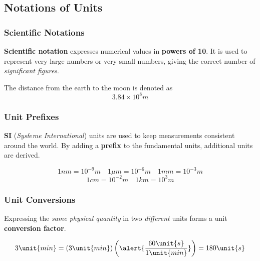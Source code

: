 
\subsection{Notations of Units}
\begin{frame}
\frametitle{Scientific Notations}
\begin{definition}
{\alert{\textbf{Scientific notation}}} expresses numerical values in \textbf{powers of 10}. It is used to represent very large numbers or very small numbers, giving the correct number of \emph{significant figures}.
\end{definition}
\begin{example}
The distance from the earth to the moon is denoted as
\[
3.84\times 10^{8}\unit{m}
\]
\end{example}
\end{frame}
\begin{frame}
\frametitle{Unit Prefixes}
\begin{definition}
\textbf{SI} (\emph{Syst$\grave{e}$me International}) units are used to keep measurements consistent around the world. By adding a {\alert{\textbf{prefix}}} to the fundamental units, additional units are derived.
\end{definition}
\begin{example}
\[1\unit{nm}=10^{-9}\unit{m}\quad 1\unit{\mu m}=10^{-6}\unit{m}\quad 1\unit{mm}=10^{-3}\unit{m}\]
\[1\unit{cm}=10^{-2}\unit{m}\quad 1\unit{km}=10^{3}\unit{m}\]
\end{example}
\end{frame}
\begin{frame}
\frametitle{Unit Conversions}
\begin{definition}
Expressing the \emph{same physical quantity} in two \emph{different} units forms a unit \textbf{\alert{conversion factor}}.
\end{definition}
\begin{example}
\[3\unit{min}=(3\unit{min})\left({\alert{\frac{60\unit{s}}{1\unit{min}}}}\right)=180\unit{s}\]
\end{example}
\end{frame}
